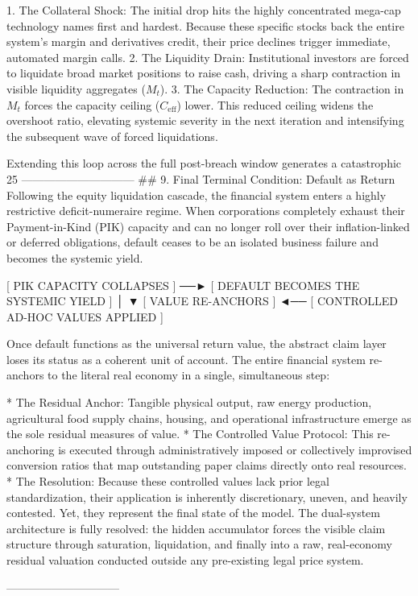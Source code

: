    1. The Collateral Shock: The initial drop hits the highly concentrated mega-cap technology names first and hardest. Because these specific stocks back the entire system's margin and derivatives credit, their price declines trigger immediate, automated margin calls.
   2. The Liquidity Drain: Institutional investors are forced to liquidate broad market positions to raise cash, driving a sharp contraction in visible liquidity aggregates ($M_t$).
   3. The Capacity Reduction: The contraction in $M_t$ forces the capacity ceiling ($C_{\text{eff}}$) lower. This reduced ceiling widens the overshoot ratio, elevating systemic severity in the next iteration and intensifying the subsequent wave of forced liquidations.

Extending this loop across the full post-breach window generates a catastrophic 25%
------------------------------
## 9. Final Terminal Condition: Default as Return
Following the equity liquidation cascade, the financial system enters a highly restrictive deficit-numeraire regime. When corporations completely exhaust their Payment-in-Kind (PIK) capacity and can no longer roll over their inflation-linked or deferred obligations, default ceases to be an isolated business failure and becomes the systemic yield.

[ PIK CAPACITY COLLAPSES ] ──► [ DEFAULT BECOMES THE SYSTEMIC YIELD ]
                                                │
                                                ▼
[ VALUE RE-ANCHORS ] ◄── [ CONTROLLED AD-HOC VALUES APPLIED ]

Once default functions as the universal return value, the abstract claim layer loses its status as a coherent unit of account. The entire financial system re-anchors to the literal real economy in a single, simultaneous step:

* The Residual Anchor: Tangible physical output, raw energy production, agricultural food supply chains, housing, and operational infrastructure emerge as the sole residual measures of value.
* The Controlled Value Protocol: This re-anchoring is executed through administratively imposed or collectively improvised conversion ratios that map outstanding paper claims directly onto real resources.
* The Resolution: Because these controlled values lack prior legal standardization, their application is inherently discretionary, uneven, and heavily contested. Yet, they represent the final state of the model. The dual-system architecture is fully resolved: the hidden accumulator forces the visible claim structure through saturation, liquidation, and finally into a raw, real-economy residual valuation conducted outside any pre-existing legal price system.

------------------------------
